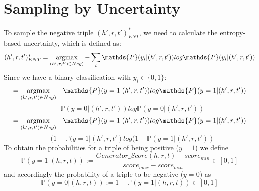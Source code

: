 
\section{Sampling by Uncertainty} \label{sec:sampling_by_uncertainty}

To sample the negative triple $(h',r,t')^{*}_{ENT}$, we need to calculate the entropy-based uncertainty, which is defined as: 
$$(h',r,t')^{*}_{ENT} = \argmax_{(h',r,t') \in Neg)} -  \sum_{i}{\mathds{P}(y_i | (h',r,t')) log \mathds{P}(y_i|(h',r,t'))}$$
Since we have a binary classification with $y_i \in \{0,1\}$:\\
$$= \argmax_{(h',r,t') \in Neg)} - \mathds{P}(y = 1| (h',r,t')) log \mathds{P}(y = 1|(h',r,t'))$$
$$- \mathds{P}(y = 0| (h',r,t')) log \mathds{P}(y = 0|(h',r,t'))$$
$$= \argmax_{(h',r,t') \in Neg)} - \mathds{P}(y = 1| (h',r,t')) log \mathds{P}(y = 1|(h',r,t'))$$
$$- (1 - \mathds{P}(y = 1|(h',r,t') log(1 - \mathds{P}(y = 1|(h',r,t'))$$
To obtain the probabilities for a triple of being positive ($y=1$) we define
\begin{equation}
    \mathds{P}(y = 1|(h, r, t)) := \frac{Generator\_Score(h, r, t) - score_{min}}{score_{max} - score_{min}} \in [0, 1]
\end{equation}
and accordingly the probability of a triple to be negative ($y=0$) as
\begin{equation}
    \mathds{P}(y = 0|(h, r, t)) := 1 - \mathds{P}(y = 1|(h, r, t)) \in [0,1]
\end{equation}